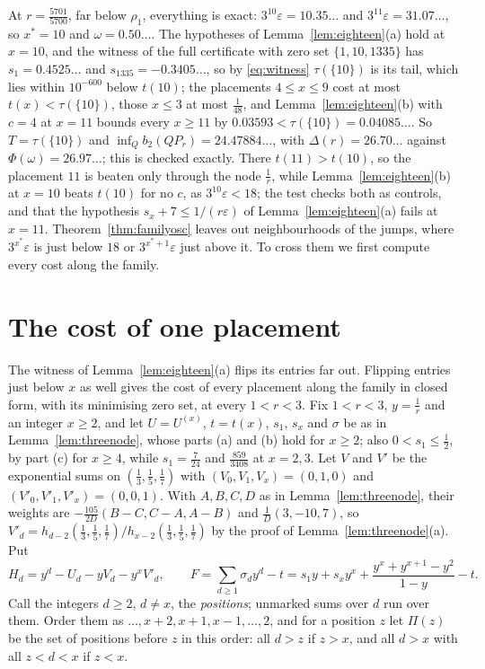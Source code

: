 \documentclass[11pt]{article}
\begin{document}
At $r=\tfrac{5701}{5700}$, far below $\rho_1$, everything is exact:
$3^{10}\varepsilon=10.35\ldots$ and $3^{11}\varepsilon=31.07\ldots$, so
$x^*=10$ and $\omega=0.50\ldots$.  The hypotheses of
Lemma~\ref{lem:eighteen}(a) hold at $x=10$, and the witness of the full
certificate with zero set $\{1,10,1335\}$ has $s_1=0.4525\ldots$ and
$s_{1335}=-0.3405\ldots$, so by \eqref{eq:witness} $\tau(\{10\})$ is its
tail, which lies within $10^{-600}$ below $t(10)$; the placements $4\le x\le9$
cost at most $t(x)<\tau(\{10\})$, those $x\le3$ at most $\tfrac1{48}$, and
Lemma~\ref{lem:eighteen}(b) with $c=4$ at $x=11$ bounds every $x\ge11$ by
$0.03593<\tau(\{10\})=0.04085\ldots$.  So $T=\tau(\{10\})$ and
$\inf_Qb_2(QP_r)=24.47884\ldots$, with $\Delta(r)=26.70\ldots$ against
$\Phi(\omega)=26.97\ldots$; this is checked exactly.
There $t(11)>t(10)$, so the placement $11$ is beaten only through the node
$\tfrac1r$, while Lemma~\ref{lem:eighteen}(b) at $x=10$ beats $t(10)$ for no
$c$, as $3^{10}\varepsilon<18$; the test checks both as controls, and that
the hypothesis $s_x+7\le1/(r\varepsilon)$ of Lemma~\ref{lem:eighteen}(a)
fails at $x=11$.
Theorem~\ref{thm:familyosc} leaves out neighbourhoods of the jumps, where
$3^{x^*}\varepsilon$ is just below $18$ or $3^{x^*+1}\varepsilon$ just above
it.  To cross them we first compute every cost along the family.

\section{The cost of one placement}\label{sec:onezero}

The witness of
Lemma~\ref{lem:eighteen}(a) flips its entries far out.  Flipping entries
just below $x$ as well gives the cost of every placement along the family
in closed form, with its minimising zero set, at every $1<r<3$.  Fix
$1<r<3$, $y=\tfrac1r$ and an integer $x\ge2$, and let $U=U^{(x)}$,
$t=t(x)$, $s_1$, $s_x$ and $\sigma$ be as in Lemma~\ref{lem:threenode},
whose parts (a) and (b) hold for $x\ge2$; also $0<s_1\le\tfrac12$, by
part (c) for $x\ge4$, while $s_1=\tfrac7{24}$ and $\tfrac{859}{3408}$ at
$x=2,3$.  Let $V$ and $V'$ be the exponential sums on
$(\tfrac13,\tfrac15,\tfrac17)$ with $(V_0,V_1,V_x)=(0,1,0)$ and
$(V'_0,V'_1,V'_x)=(0,0,1)$.  With $A,B,C,D$ as in
Lemma~\ref{lem:threenode}, their weights are $-\tfrac{105}{2D}(B-C,C-A,A-B)$
and $\tfrac1D(3,-10,7)$, so
$V'_d=h_{d-2}(\tfrac13,\tfrac15,\tfrac17)/h_{x-2}(\tfrac13,\tfrac15,\tfrac17)$
by the proof of Lemma~\ref{lem:threenode}(a).  Put
\[
  H_d=y^d-U_d-yV_d-y^xV'_d,\qquad
  F=\sum_{d\ge1}\sigma_dy^d-t=s_1y+s_xy^x+\frac{y^x+y^{x+1}-y^2}{1-y}-t .
\]
Call the integers $d\ge2$, $d\ne x$, the \emph{positions}; unmarked sums
over $d$ run over them.  Order them as $\ldots,x+2,x+1,x-1,\ldots,2$, and for
a position $z$ let $\Pi(z)$ be the set of positions before $z$ in this
order: all $d>z$ if $z>x$, and all $d>x$ with all $z<d<x$ if $z<x$.
\end{document}
